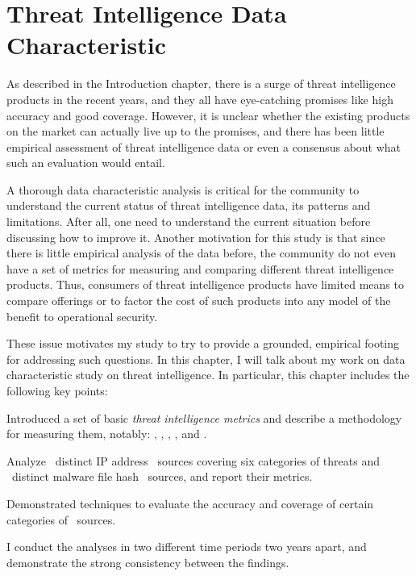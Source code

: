 \chapter{Threat Intelligence Data Characteristic}
\label{chapter:data_character}

As described in the Introduction 
chapter, there is a surge of threat intelligence products in the 
recent years, and they all have eye-catching promises like high 
accuracy and good coverage. However, it is unclear whether the
existing products on the market can actually live up to the 
promises, and there has been little empirical assessment of threat
intelligence data or even a consensus about what such an
evaluation would entail. 

A thorough data characteristic analysis is critical for the 
community to understand the current status of threat intelligence 
data, its patterns and limitations. After all, one need to understand
the current situation before discussing how to improve it. 
Another motivation for this 
study is that since there is little empirical analysis of the 
data before, the community do not even have a set of metrics for
measuring and comparing different threat intelligence products. 
Thus, consumers of threat intelligence products have limited means 
to compare offerings or to factor the cost of such products into 
any model of the benefit to operational security.

These issue motivates my study to try to provide a grounded,
empirical footing for addressing such questions. 
In this chapter, I will talk about my work on data characteristic
study on threat intelligence. In particular, this chapter includes 
the following key points:
\begin{prettylist}
\item Introduced a set of basic \emph{threat intelligence metrics}
and describe a methodology for measuring them, notably: 
,
, ,
,  and .
\item Analyze \numipfeeds\ distinct IP address \ti\ sources covering
six categories of threats and \numhashfeeds\ distinct malware file hash
\ti\ sources, and report their metrics.
\item Demonstrated techniques to evaluate the accuracy and coverage of
certain categories of \ti\ sources.
\item I conduct the analyses in two different time periods two 
years apart, and demonstrate the strong consistency between the 
findings.
\end{prettylist}

